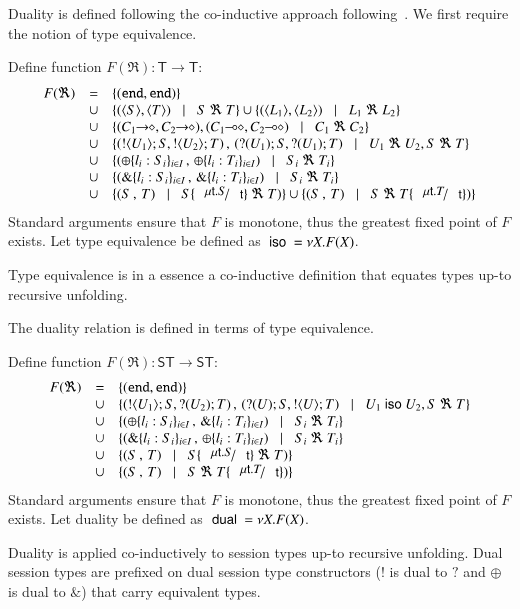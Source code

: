 Duality is defined following the co-inductive
approach following~\cite{GH05,TGC14}.
We first require the notion of type equivalence.
%
\begin{definition}\rm
\label{def:type_equiv}
	Define function $F(\Re): \mathsf{T} \longrightarrow \mathsf{T}$:
	\[
		\begin{array}{rcl}
			F(\Re) 	&=&	\set{(\tinact, \tinact)} \\
				&\cup&	\set{(\chtype{S}, \chtype{T}) \bnfbar S\ \Re\ T} \cup \set{(\chtype{L_1}, \chtype{L_2}) \bnfbar L_1\ \Re\ L_2}\\
				&\cup&	\set{(\shot{C_1}, \shot{C_2}), (\lhot{C_1}, \lhot{C_2}) \bnfbar C_1\ \Re\ C_2}\\
				&\cup&	\set{(\btout{U_1} S, \btout{U_2} T)\,,\, (\btinp{U_1} S, \btinp{U_1} T) \bnfbar U_1\ \Re\ U_2, S\ \Re\ T}\\
				&\cup&	\set{(\btsel{l_i: S_i}_{i \in I} \,,\, \btsel{l_i: T_i}_{i \in I}) \bnfbar  S_i\ \Re\ T_i}\\
				&\cup&	\set{(\btbra{l_i: S_i}_{i \in I}\,,\, \btbra{l_i: T_i}_{i \in I}) \bnfbar S_i\ \Re\ T_i}\\
				&\cup&	\set{(S\,,\, T) \bnfbar S\subst{\trec{t}{S}}{\vart{t}}\ \Re\ T)}
				\cup	\set{(S\,,\, T) \bnfbar S\ \Re\ T\subst{\trec{t}{T}}{\vart{t}})}
		\end{array}
	\]	
	\noi Standard arguments ensure that $F$ is monotone, thus the greatest fixed point
	of $F$ exists. Let type equivalence be defined as $\ \mathsf{iso}\  = \nu X. F(X)$.
\end{definition}
%
\noi Type equivalence is in a essence a co-inductive definition that
equates types up-to recursive unfolding.

The duality relation is defined in terms of type equivalence.
%
\begin{definition}[Duality]\rm
	Define function $F(\Re): \mathsf{ST} \longrightarrow \mathsf{ST}$:
	\[
		\begin{array}{rcl}
			F(\Re) 	&=&	\set{(\tinact, \tinact)}\\
				&\cup&	\set{(\btout{U_1} S, \btinp{U_2} T)\,,\, (\btinp{U} S, \btout{U} T) \bnfbar U_1 \iso U_2, S\ \Re\ T}\\
				&\cup&	\set{(\btsel{l_i: S_i}_{i \in I} \,,\, \btbra{l_i: T_i}_{i \in I}) \bnfbar  S_i\ \Re\ T_i}\\
				&\cup&	\set{(\btbra{l_i: S_i}_{i \in I}\,,\, \btsel{l_i: T_i}_{i \in I}) \bnfbar S_i\ \Re\ T_i}\\
				&\cup&	\set{(S\,,\, T) \bnfbar S\subst{\trec{t}{S}}{\vart{t}}\ \Re\ T)}\\
				&\cup&	\set{(S\,,\, T) \bnfbar S\ \Re\ T\subst{\trec{t}{T}}{\vart{t}})}
		\end{array}
	\]	
	\noi Standard arguments ensure that $F$ is monotone, thus the greatest fixed point
	of $F$ exists. Let duality be defined as $\ \mathsf{dual}\  = \nu X. F(X)$.
\end{definition}
%
Duality is applied co-inductively to session types
up-to recursive unfolding.
Dual session types are prefixed
on dual session type constructors
($!$ is dual to $?$ and $\oplus$ is dual to $\&$)
that carry equivalent types.

